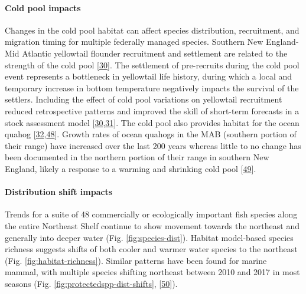 \documentclass[
  10pt,
]{article}
\begin{document}
\hypertarget{cold-pool-impacts}{%
\paragraph{Cold pool impacts}\label{cold-pool-impacts}}

Changes in the cold pool habitat can affect species distribution, recruitment, and migration timing for multiple federally managed species. Southern New England-Mid Atlantic yellowtail flounder recruitment and settlement are related to the strength of the cold pool {[}\protect\hyperlink{ref-miller_state-space_2016}{30}{]}. The settlement of pre-recruits during the cold pool event represents a bottleneck in yellowtail life history, during which a local and temporary increase in bottom temperature negatively impacts the survival of the settlers. Including the effect of cold pool variations on yellowtail recruitment reduced retrospective patterns and improved the skill of short-term forecasts in a stock assessment model {[}\protect\hyperlink{ref-miller_state-space_2016}{30},\protect\hyperlink{ref-du_pontavice_incorporating_nodate}{31}{]}. The cold pool also provides habitat for the ocean quahog {[}\protect\hyperlink{ref-friedland_middle_2022}{32},\protect\hyperlink{ref-powell_ocean_2020}{48}{]}. Growth rates of ocean quahogs in the MAB (southern portion of their range) have increased over the last 200 years whereas little to no change has been documented in the northern portion of their range in southern New England, likely a response to a warming and shrinking cold pool {[}\protect\hyperlink{ref-pace_two-hundred_2018}{49}{]}.

\hypertarget{distribution-shift-impacts}{%
\paragraph{Distribution shift impacts}\label{distribution-shift-impacts}}

Trends for a suite of 48 commercially or ecologically important fish species along the entire Northeast Shelf continue to show movement towards the northeast and generally into deeper water (Fig. \ref{fig:species-dist}). Habitat model-based species richness suggests shifts of both cooler and warmer water species to the northeast (Fig. \ref{fig:habitat-richness}). Similar patterns have been found for marine mammal, with multiple species shifting northeast between 2010 and 2017 in most seasons (Fig. \ref{fig:protectedspp-dist-shifts}, {[}\protect\hyperlink{ref-chavez-rosales_detection_2022}{50}{]}).
\end{document}
